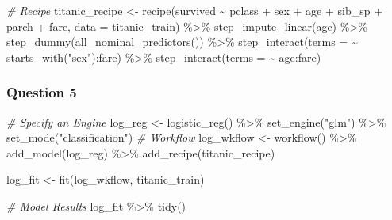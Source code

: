 \documentclass[
]{article}
\newenvironment{Shaded}{\begin{snugshade}}{\end{snugshade}}
\newcommand{\AttributeTok}[1]{\textcolor[rgb]{0.77,0.63,0.00}{#1}}
\newcommand{\CommentTok}[1]{\textcolor[rgb]{0.56,0.35,0.01}{\textit{#1}}}
\newcommand{\FunctionTok}[1]{\textcolor[rgb]{0.00,0.00,0.00}{#1}}
\newcommand{\NormalTok}[1]{#1}
\newcommand{\OtherTok}[1]{\textcolor[rgb]{0.56,0.35,0.01}{#1}}
\newcommand{\SpecialCharTok}[1]{\textcolor[rgb]{0.00,0.00,0.00}{#1}}
\newcommand{\StringTok}[1]{\textcolor[rgb]{0.31,0.60,0.02}{#1}}
\begin{document}
\begin{Shaded}
\begin{Highlighting}[]
\CommentTok{\# Recipe}
\NormalTok{titanic\_recipe }\OtherTok{\textless{}{-}} \FunctionTok{recipe}\NormalTok{(survived }\SpecialCharTok{\textasciitilde{}}\NormalTok{ pclass }\SpecialCharTok{+}\NormalTok{ sex }\SpecialCharTok{+}\NormalTok{ age }\SpecialCharTok{+}\NormalTok{ sib\_sp }\SpecialCharTok{+}\NormalTok{ parch }\SpecialCharTok{+}\NormalTok{ fare,}
                         \AttributeTok{data =}\NormalTok{ titanic\_train) }\SpecialCharTok{\%\textgreater{}\%}
  \FunctionTok{step\_impute\_linear}\NormalTok{(age) }\SpecialCharTok{\%\textgreater{}\%}
  \FunctionTok{step\_dummy}\NormalTok{(}\FunctionTok{all\_nominal\_predictors}\NormalTok{()) }\SpecialCharTok{\%\textgreater{}\%}
  \FunctionTok{step\_interact}\NormalTok{(}\AttributeTok{terms =} \SpecialCharTok{\textasciitilde{}} \FunctionTok{starts\_with}\NormalTok{(}\StringTok{"sex"}\NormalTok{)}\SpecialCharTok{:}\NormalTok{fare) }\SpecialCharTok{\%\textgreater{}\%}
  \FunctionTok{step\_interact}\NormalTok{(}\AttributeTok{terms =} \SpecialCharTok{\textasciitilde{}}\NormalTok{ age}\SpecialCharTok{:}\NormalTok{fare)}
\end{Highlighting}
\end{Shaded}

\hypertarget{question-5}{%
\subsubsection{Question 5}\label{question-5}}

\begin{Shaded}
\begin{Highlighting}[]
\CommentTok{\# Specify an Engine}
\NormalTok{log\_reg }\OtherTok{\textless{}{-}} \FunctionTok{logistic\_reg}\NormalTok{() }\SpecialCharTok{\%\textgreater{}\%}
  \FunctionTok{set\_engine}\NormalTok{(}\StringTok{"glm"}\NormalTok{) }\SpecialCharTok{\%\textgreater{}\%}
  \FunctionTok{set\_mode}\NormalTok{(}\StringTok{"classification"}\NormalTok{)}
\CommentTok{\# Workflow}
\NormalTok{log\_wkflow }\OtherTok{\textless{}{-}} \FunctionTok{workflow}\NormalTok{() }\SpecialCharTok{\%\textgreater{}\%}
  \FunctionTok{add\_model}\NormalTok{(log\_reg) }\SpecialCharTok{\%\textgreater{}\%}
  \FunctionTok{add\_recipe}\NormalTok{(titanic\_recipe)}

\NormalTok{log\_fit }\OtherTok{\textless{}{-}} \FunctionTok{fit}\NormalTok{(log\_wkflow, titanic\_train)}

\CommentTok{\# Model Results}
\NormalTok{log\_fit }\SpecialCharTok{\%\textgreater{}\%}
  \FunctionTok{tidy}\NormalTok{()}
\end{Highlighting}
\end{Shaded}
\end{document}

